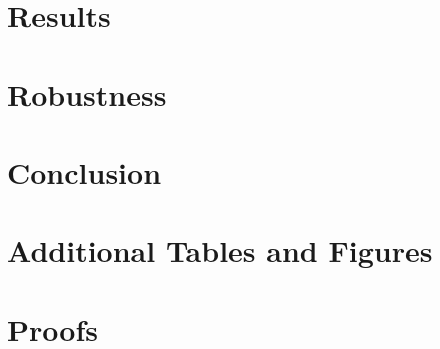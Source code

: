 \documentclass[12pt]{article}
\theoremstyle{definition}
\begin{document}


\section{Results}\label{sec:results}

% 



\section{Robustness}\label{sec:robustness}

% 


\section{Conclusion}\label{sec:conclusion}



\newpage
\singlespacing




\newpage
\begin{appendices}

\section{Additional Tables and Figures}\label{sec:appendix_tables}

% 

\section{Proofs}\label{sec:appendix_proofs}

\end{appendices}
\end{document}
